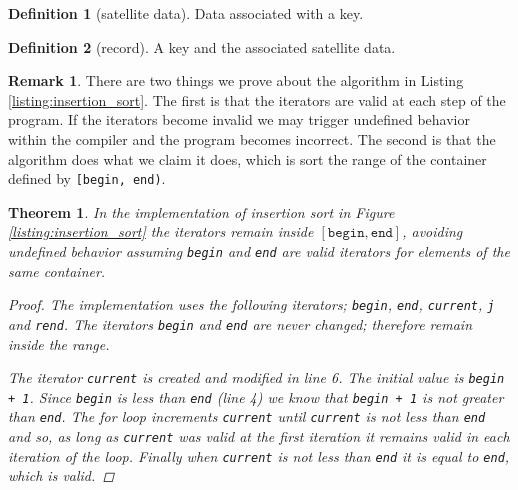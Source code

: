 \documentclass[oneside]{book}
\theoremstyle{definition}
\newtheorem{definition}{Definition}[chapter]
\newtheorem{rem}{Remark}[chapter]
\theoremstyle{plain}
\newtheorem{thm}{Theorem}[chapter]
\begin{document}
\begin{spacing}{1.618}
\begin{definition}[satellite data]
	Data associated with a key. 
\end{definition}

\begin{definition}[record]
	A key and the associated satellite data.
\end{definition}

\begin{minipage}{\textwidth}
	\label{listing:insertion_sort}
\end{minipage}

\begin{rem}
	There are two things we prove about the algorithm in Listing \ref{listing:insertion_sort}. The first is that the iterators are valid at each step of the program. If the iterators become invalid we may trigger undefined behavior within the compiler and the program becomes incorrect. The second is that the algorithm does what we claim it does, which is sort the range of the container defined by \texttt{[begin, end)}. 
\end{rem}

\begin{thm}
	In the implementation of insertion sort in Figure \ref{listing:insertion_sort} the iterators remain inside $[\texttt{begin}, \texttt{end}]$, avoiding undefined behavior assuming \texttt{begin} and \texttt{end} are valid iterators for elements of the same container. 
	\begin{proof}
		The implementation uses the following iterators; \texttt{begin}, \texttt{end}, \texttt{current}, \texttt{j} and \texttt{rend}. The iterators \texttt{begin} and \texttt{end} are never changed; therefore remain inside the range. 
		
		The iterator \texttt{current} is created and modified in line 6. The initial value is \texttt{begin + 1}. Since \texttt{begin} is less than \texttt{end} (line 4) we know that \texttt{begin + 1} is not greater than \texttt{end}. The for loop increments \texttt{current} until \texttt{current} is not less than \texttt{end} and so, as long as \texttt{current} was valid at the first iteration it remains valid in each iteration of the loop. Finally when \texttt{current} is not less than \texttt{end} it is equal to \texttt{end}, which is valid.
		

\end{proof}
\end{thm}
\end{spacing}
\end{document}

